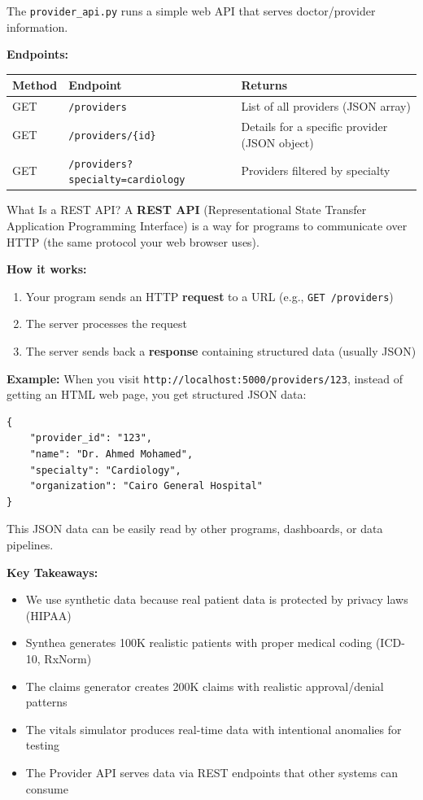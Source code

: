 \documentclass[12pt, a4paper, oneside]{report}
\begin{document}
The \texttt{provider\_api.py} runs a simple web API that serves doctor/provider information.

\textbf{Endpoints:}
\begin{center}
\begin{tabular}{l l p{6cm}}
    \toprule
    \textbf{Method} & \textbf{Endpoint} & \textbf{Returns} \\
    \midrule
    GET & \texttt{/providers} & List of all providers (JSON array) \\
    GET & \texttt{/providers/\{id\}} & Details for a specific provider (JSON object) \\
    GET & \texttt{/providers?specialty=cardiology} & Providers filtered by specialty \\
    \bottomrule
\end{tabular}
\end{center}

\begin{conceptbox}{What Is a REST API?}
A \textbf{REST API} (Representational State Transfer Application Programming Interface) is a way for programs to communicate over HTTP (the same protocol your web browser uses).

\textbf{How it works:}
\begin{enumerate}[label=\textcolor{primary}{\arabic*.}]
    \item Your program sends an HTTP \textbf{request} to a URL (e.g., \texttt{GET /providers})
    \item The server processes the request
    \item The server sends back a \textbf{response} containing structured data (usually JSON)
\end{enumerate}

\textbf{Example:} When you visit \texttt{http://localhost:5000/providers/123}, instead of getting an HTML web page, you get structured JSON data:
\begin{lstlisting}[style=pythonstyle]
{
    "provider_id": "123",
    "name": "Dr. Ahmed Mohamed",
    "specialty": "Cardiology",
    "organization": "Cairo General Hospital"
}
\end{lstlisting}
This JSON data can be easily read by other programs, dashboards, or data pipelines.
\end{conceptbox}

\begin{summarybox}
\textbf{Key Takeaways:}
\begin{itemize}
    \item We use synthetic data because real patient data is protected by privacy laws (HIPAA)
    \item Synthea generates 100K realistic patients with proper medical coding (ICD-10, RxNorm)
    \item The claims generator creates 200K claims with realistic approval/denial patterns
    \item The vitals simulator produces real-time data with intentional anomalies for testing
    \item The Provider API serves data via REST endpoints that other systems can consume
\end{itemize}
\end{summarybox}
\end{document}
